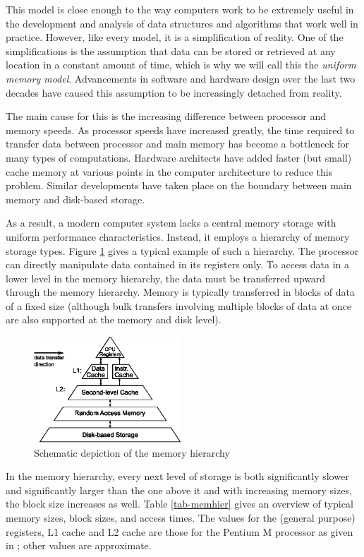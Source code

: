 \documentclass{acm_proc_article-sp}
\begin{document}
This model is close enough to the way computers work to be extremely useful in the development and analysis of data structures and algorithms that work well in practice. However, like every model, it is a simplification of reality. One of the simplifications is the assumption that data can be stored or retrieved at any location in a constant amount of time, which is why we will call this the \emph{uniform memory model}.
Advancements in software and hardware design over the last two de\-cades have caused this assumption to be increasingly detached from reality.

The main cause for this is the increasing difference between processor and memory speeds. As processor speeds have increased greatly, the time required to transfer data between processor and main memory has become a bottleneck for many types of computations. Hardware architects have added faster (but small) cache memory at various points in the computer architecture to reduce this problem.
Similar developments have taken place on the boundary between main memory and disk-based storage.

As a result, a modern computer system lacks a central memory storage with uniform performance characteristics. Instead, it employs a hierarchy of memory storage types. Figure \ref{fig-memhier} gives a typical example of such a hierarchy. The processor can directly manipulate data contained in its registers only. To access data in a lower level in the memory hierarchy, the data must be transferred upward through the memory hierarchy. Memory is typically transferred in blocks of data of a fixed size (although bulk transfers involving multiple blocks of data at once are also supported at the memory and disk level).

\begin{figure}
\centering
\includegraphics[width=55mm]{memhier}
\caption{Schematic depiction of the memory hierarchy}\label{fig-memhier}
\end{figure}

In the memory hierarchy, every next level of storage is both significantly slower and significantly larger than the one above it and with increasing memory sizes, the block size increases as well. Table \ref{tab-memhier} gives an overview of typical memory sizes, block sizes, and access times. The values for the (general purpose) registers, L1 cache and L2 cache are those for the Pentium M processor as given in \cite{intel-opt}; other values are approximate.
\end{document}
